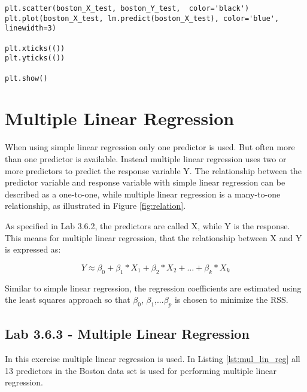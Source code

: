 \begin{lstlisting}[caption={Python plotting of linear regression function}, label=lst:lin_reg_plot, mathescape=true]
plt.scatter(boston_X_test, boston_Y_test,  color='black')
plt.plot(boston_X_test, lm.predict(boston_X_test), color='blue',
linewidth=3)

plt.xticks(())
plt.yticks(())

plt.show()
\end{lstlisting}


\section{Multiple Linear Regression}

When using simple linear regression only one predictor is used. But often more than one predictor is available. Instead multiple linear regression uses two or more predictors to predict the response variable Y. The relationship between the predictor variable and response variable with simple linear regression can be described as a one-to-one, while multiple linear regression is a many-to-one relationship, as illustrated in Figure \ref{fig:relation}.


\FloatBarrier
As specified in Lab 3.6.2, the predictors are called X, while Y is the response. This means for multiple linear regression, that the relationship between X and Y is expressed as:

\begin{equation}
Y \approx \beta_0 + \beta_1 * X_1 + \beta_2 * X_2 + … + \beta_k * X_k
\end{equation}

Similar to simple linear regression, the regression coefficients are estimated using the least squares approach so that $\beta_0$, $\beta_1$,...$\beta_p$ is chosen to minimize the RSS.

\subsection{Lab 3.6.3 - Multiple Linear Regression}

In this exercise multiple linear regression is used. In Listing \ref{lst:mul_lin_reg} all 13 predictors in the Boston data set is used for performing multiple linear regression.

